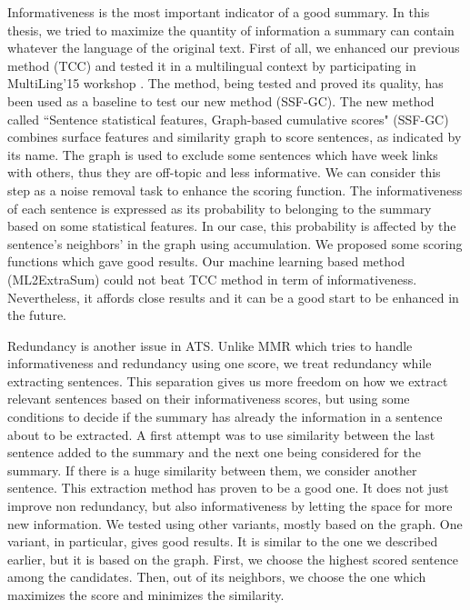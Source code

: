 \documentclass[12pt, oneside, a4paper]{article}
\begin{document}
Informativeness is the most important indicator of a good summary.
In this thesis, we tried to maximize the quantity of information a summary can contain whatever the language of the original text. 
First of all, we enhanced our previous method (TCC) \citep{13-aries-al} and tested it in a multilingual context by participating in MultiLing'15 workshop \citep{15-aries-al}.
The method, being tested and proved its quality, has been used as a baseline to test our new method (SSF-GC). 
The new method called ``Sentence statistical features, Graph-based cumulative scores" (SSF-GC) combines surface features and similarity graph to score sentences, as indicated by its name. 
The graph is used to exclude some sentences which have week links with others, thus they are off-topic and less informative. 
We can consider this step as a noise removal task to enhance the scoring function. 
The informativeness of each sentence is expressed as its probability to belonging to the summary based on some statistical features. 
In our case, this probability is affected by the sentence's neighbors' in the graph using accumulation.
We proposed some scoring functions which gave good results.
Our machine learning based method (ML2ExtraSum) could not beat TCC method in term of informativeness. 
Nevertheless, it affords close results and it can be a good start to be enhanced in the future.


Redundancy is another issue in ATS. 
Unlike MMR \citep{98-carbonell-goldstein} which tries to handle informativeness and redundancy using one score, we treat redundancy while extracting sentences. 
This separation gives us more freedom on how we extract relevant sentences based on their informativeness scores, but using some conditions to decide if the summary has already the information in a sentence about to be extracted. 
A first attempt was to use similarity between the last sentence added to the summary and the next one being considered for the summary. 
If there is a huge similarity between them, we consider another sentence. 
This extraction method has proven to be a good one. 
It does not just improve non redundancy, but also informativeness by letting the space for more new information. 
We tested using other variants, mostly based on the graph. 
One variant, in particular, gives good results. 
It is similar to the one we described earlier, but it is based on the graph. 
First, we choose the highest scored sentence among the candidates. 
Then, out of its neighbors, we choose the one which maximizes the score and minimizes the similarity.  
\end{document}
